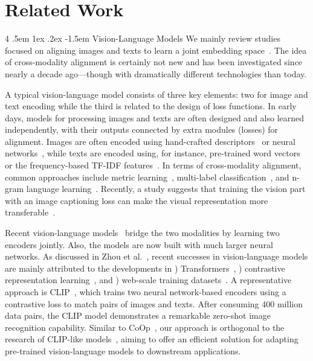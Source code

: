 \documentclass[10pt,twocolumn,letterpaper]{article}
\makeatletter
\renewcommand\paragraph{
  \@startsection{paragraph} {4} {\z@} {.5em \@plus1ex \@minus.2ex} {-1.5em} {\normalfont\normalsize\bfseries} }
\newcommand{\romannum}[1]{\romannumeral #1} \newcommand{\rotbox}[1]{\rotatebox{90}{#1}}
\makeatother
\begin{document}
\section{Related Work}
\label{sec:related_work}

\paragraph{Vision-Language Models}
We mainly review studies focused on aligning images and texts to learn a joint embedding space~\cite{radford2021learning,jia2021scaling,zhang2020contrastive}. The idea of cross-modality alignment is certainly not new and has been investigated since nearly a decade ago---though with dramatically different technologies than today.

A typical vision-language model consists of three key elements: two for image and text encoding while the third is related to the design of loss functions. In early days, models for processing images and texts are often designed and also learned independently, with their outputs connected by extra modules (losses) for alignment. Images are often encoded using hand-crafted descriptors~\cite{socher2013zero,elhoseiny2013write} or neural networks~\cite{frome2013devise,lei2015predicting}, while texts are encoded using, for instance, pre-trained word vectors~\cite{socher2013zero,frome2013devise} or the frequency-based TF-IDF features~\cite{elhoseiny2013write,lei2015predicting}. In terms of cross-modality alignment, common approaches include metric learning~\cite{frome2013devise}, multi-label classification~\cite{joulin2016learning,gomez2017self}, and n-gram language learning~\cite{li2017learning}. Recently, a study suggests that training the vision part with an image captioning loss can make the visual representation more transferable~\cite{desai2021virtex}.

Recent vision-language models~\cite{radford2021learning,jia2021scaling,furst2021cloob,li2021supervision} bridge the two modalities by learning two encoders jointly. Also, the models are now built with much larger neural networks. As discussed in Zhou et al.~\cite{zhou2021coop}, recent successes in vision-language models are mainly attributed to the developments in \romannum{1}) Transformers~\cite{vaswani2017attention}, \romannum{2}) contrastive representation learning~\cite{chen2020simple,he2020momentum,henaff2020data}, and \romannum{3}) web-scale training datasets~\cite{radford2021learning,jia2021scaling}. A representative approach is CLIP~\cite{radford2021learning}, which trains two neural network-based encoders using a contrastive loss to match pairs of images and texts. After consuming 400 million data pairs, the CLIP model demonstrates a remarkable zero-shot image recognition capability. Similar to CoOp~\cite{zhou2021coop}, our approach is orthogonal to the research of CLIP-like models~\cite{radford2021learning,jia2021scaling,furst2021cloob,li2021supervision}, aiming to offer an efficient solution for adapting pre-trained vision-language models to downstream applications.
\end{document}
